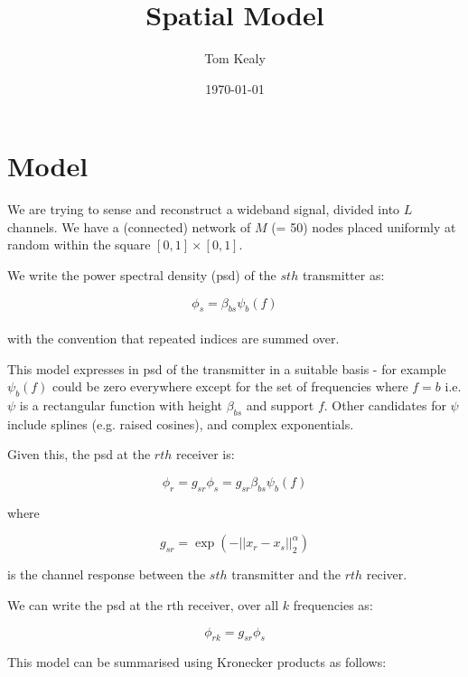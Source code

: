 \documentclass{article}
\begin{document}
\nocite{*}
\title{Spatial Model}
\date{\today}
\author{Tom Kealy}
\maketitle

\section{Model}
We are trying to sense and reconstruct a wideband signal, divided into \(L\) channels. We have a (connected) network of \(M\) (= 50) nodes placed uniformly at random within the square \(  \left[0,1\right]\times \left[0,1\right] \).

We write the power spectral density (psd) of the \(sth\) transmitter as:

\begin{equation}
\phi_s = \beta_{bs} \psi_b\left(f\right)
\label{basis_expansion}
\end{equation}
\\
with the convention that repeated indices are summed over. 

This model expresses in psd of the transmitter in a suitable basis - for example \(\psi_b\left(f\right)\) could be zero everywhere except for the set of frequencies where \(f=b\) i.e. \(\psi\) is a rectangular function with height \(\beta_{bs}\) and support \(f\). Other candidates for \(\psi\) include splines (e.g. raised cosines), and complex exponentials. 

Given this, the psd at the \(rth\) receiver is:

\begin{equation}
\phi_r = g_{sr}\phi_s = g_{sr}\beta_{bs}\psi_b\left(f\right)
\end{equation}

where

\begin{equation}
g_{sr} = \exp\left(-||x_r - x_s||_2^\alpha\right)
\end{equation}

is the channel response between the \(sth\) transmitter and the \(rth\) reciver.

We can write the psd at the rth receiver, over all \(k\) frequencies as:

\begin{equation}
\phi_{rk} = g_{sr}\phi_s 
\end{equation}

This model can be summarised using Kronecker products as follows:
\end{document}

